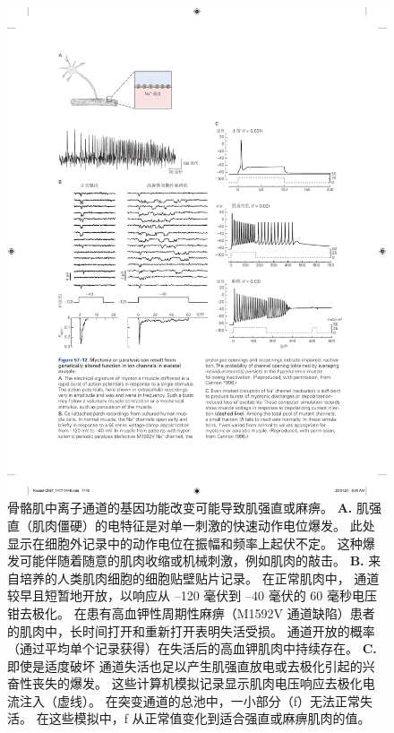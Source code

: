 \begin{figure}[htbp]
	\centering
	\includegraphics[width=1.0\linewidth]{chap57/fig_57_12}
	\caption{骨骼肌中离子通道的基因功能改变可能导致肌强直或麻痹。
		\textbf{A.} 肌强直（肌肉僵硬）的电特征是对单一刺激的快速动作电位爆发。
		此处显示在细胞外记录中的动作电位在振幅和频率上起伏不定。
		这种爆发可能伴随着随意的肌肉收缩或机械刺激，例如肌肉的敲击。
		\textbf{B.} 来自培养的人类肌肉细胞的细胞贴壁贴片记录。
		在正常肌肉中， 通道较早且短暂地开放，以响应从 –120 毫伏到 –40 毫伏的 60 毫秒电压钳去极化。
		在患有高血钾性周期性麻痹（M1592V  通道缺陷）患者的肌肉中，长时间打开和重新打开表明失活受损。
		通道开放的概率（通过平均单个记录获得）在失活后的高血钾肌肉中持续存在。
		\textbf{C.} 即使是适度破坏  通道失活也足以产生肌强直放电或去极化引起的兴奋性丧失的爆发。
		这些计算机模拟记录显示肌肉电压响应去极化电流注入（虚线）。
		在突变通道的总池中，一小部分（f）无法正常失活。
		在这些模拟中，f 从正常值变化到适合强直或麻痹肌肉的值。}
	\label{fig:57_12}
\end{figure}


